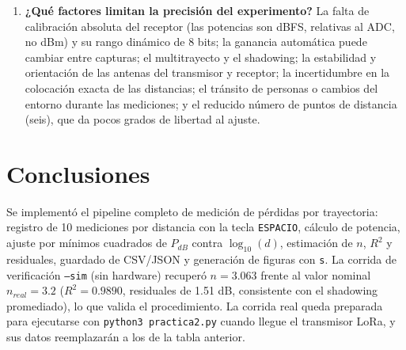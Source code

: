 \documentclass[11pt,a4paper]{article}
\begin{document}
\begin{enumerate}
  \item \textbf{¿Qué factores limitan la precisión del experimento?} La falta de calibración absoluta del receptor (las potencias son dBFS, relativas al ADC, no dBm) y su rango dinámico de 8 bits; la ganancia automática puede cambiar entre capturas; el multitrayecto y el shadowing; la estabilidad y orientación de las antenas del transmisor y receptor; la incertidumbre en la colocación exacta de las distancias; el tránsito de personas o cambios del entorno durante las mediciones; y el reducido número de puntos de distancia (seis), que da pocos grados de libertad al ajuste.
\end{enumerate}

\section{Conclusiones}

Se implementó el pipeline completo de medición de pérdidas por trayectoria: registro de 10 mediciones por distancia con la tecla \texttt{ESPACIO}, cálculo de potencia, ajuste por mínimos cuadrados de $P_{dB}$ contra $\log_{10}(d)$, estimación de $n$, $R^2$ y residuales, guardado de CSV/JSON y generación de figuras con \texttt{s}. La corrida de verificación \texttt{--sim} (sin hardware) recuperó $n=3.063$ frente al valor nominal $n_{real}=3.2$ ($R^2=0.9890$, residuales de 1.51 dB, consistente con el shadowing promediado), lo que valida el procedimiento. La corrida real queda preparada para ejecutarse con \texttt{python3 practica2.py} cuando llegue el transmisor LoRa, y sus datos reemplazarán a los de la tabla anterior.
\end{document}
